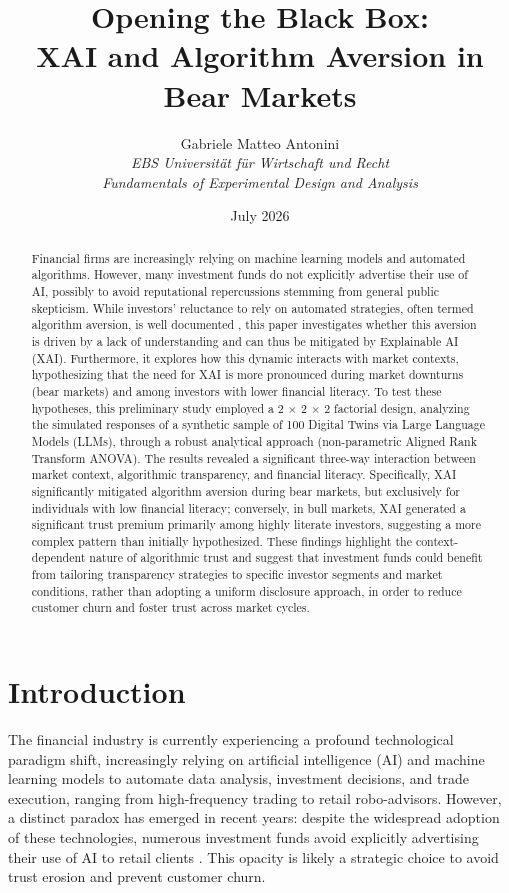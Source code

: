 \documentclass[10pt, a4paper]{article} %
\title{\textbf{Opening the Black Box:} \\ 
\textbf{XAI and Algorithm Aversion in Bear Markets}}
\author{Gabriele Matteo Antonini \\ \textit{EBS Universität für Wirtschaft und Recht} \\ \textit{Fundamentals of Experimental Design and Analysis}}
\date{July 2026}
\begin{document}
\maketitle

\begin{abstract}
\noindent Financial firms are increasingly relying on machine learning models and automated algorithms. However, many investment funds do not explicitly advertise their use of AI, possibly to avoid reputational repercussions stemming from general public skepticism.
While investors' reluctance to rely on automated strategies, often termed algorithm aversion, is well documented \citep{dietvorst2015algorithm}, this paper investigates whether this aversion is driven by a lack of understanding and can thus be mitigated by Explainable AI (XAI). Furthermore, it explores how this dynamic interacts with market contexts, hypothesizing that the need for XAI is more pronounced during market downturns (bear markets) and among investors with lower financial literacy.
To test these hypotheses, this preliminary study employed a 2 $\times$ 2 $\times$ 2 factorial design, analyzing the simulated responses of a synthetic sample of 100 Digital Twins via Large Language Models (LLMs), through a robust analytical approach (non-parametric Aligned Rank Transform ANOVA).
The results revealed a significant three-way interaction between market context, algorithmic transparency, and financial literacy. 
Specifically, XAI significantly mitigated algorithm aversion during bear markets, but exclusively for individuals with low financial literacy; conversely, in bull markets, XAI generated a significant trust premium primarily among highly literate investors, suggesting a more complex pattern than initially hypothesized.
These findings highlight the context-dependent nature of algorithmic trust and suggest that investment funds could benefit from tailoring transparency strategies to specific investor segments and market conditions, rather than adopting a uniform disclosure approach, in order to reduce customer churn and foster trust across market cycles.
\end{abstract}

\newpage

\section{Introduction}

The financial industry is currently experiencing a profound technological paradigm shift, increasingly relying on artificial intelligence (AI) and machine learning models to automate data analysis, investment decisions, and trade execution, ranging from high-frequency trading to retail robo-advisors. However, a distinct paradox has emerged in recent years: despite the widespread adoption of these technologies, numerous investment funds avoid explicitly advertising their use of AI to retail clients \citep{esma2023artificial}. This opacity is likely a strategic choice to avoid trust erosion and prevent customer churn.
\end{document}
